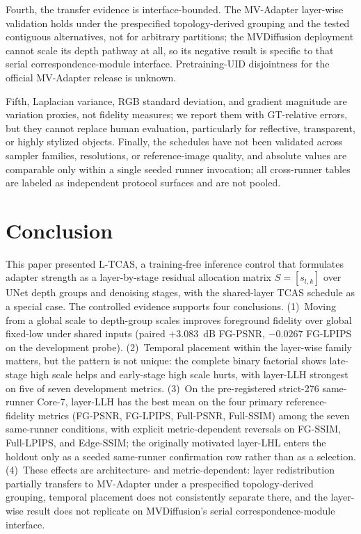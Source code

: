\documentclass[times,twocolumn,final]{elsarticle}
\begin{document}
Fourth, the transfer evidence is interface-bounded. The MV-Adapter layer-wise
validation holds under the prespecified topology-derived grouping and the
tested contiguous alternatives, not for arbitrary partitions; the
MVDiffusion deployment cannot scale its depth pathway at all, so its
negative result is specific to that serial correspondence-module interface.
Pretraining-UID disjointness for the official MV-Adapter release is unknown.

Fifth, Laplacian variance, RGB standard deviation, and gradient magnitude are
variation proxies, not fidelity measures; we report them with GT-relative
errors, but they cannot replace human evaluation, particularly for reflective,
transparent, or highly stylized objects. Finally, the schedules have not been
validated across sampler families, resolutions, or reference-image quality,
and absolute values are comparable only within a single seeded runner
invocation; all cross-runner tables are labeled as independent protocol
surfaces and are not pooled.

\section{Conclusion}
\label{sec:conclusion}

This paper presented L-TCAS, a training-free inference control that
formulates adapter strength as a layer-by-stage residual allocation matrix
$S=[s_{l,k}]$ over UNet depth groups and denoising stages, with the
shared-layer TCAS schedule as a special case. The controlled evidence
supports four conclusions. (1)~Moving from a global scale to depth-group
scales improves foreground fidelity over global fixed-low under shared
inputs (paired $+3.083$~dB FG-PSNR, $-0.0267$ FG-LPIPS on the development
probe). (2)~Temporal placement within the layer-wise family matters, but the
pattern is not unique: the complete binary factorial shows late-stage high
scale helps and early-stage high scale hurts, with layer-LLH strongest on
five of seven development metrics. (3)~On the pre-registered strict-276
same-runner Core-7, layer-LLH has the best mean on the four primary
reference-fidelity metrics (FG-PSNR, FG-LPIPS, Full-PSNR, Full-SSIM) among
the seven same-runner conditions, with explicit metric-dependent reversals
on FG-SSIM, Full-LPIPS, and Edge-SSIM; the originally motivated layer-LHL
enters the holdout only as a seeded same-runner confirmation row rather than
as a selection. (4)~These effects are architecture- and metric-dependent:
layer redistribution partially transfers to MV-Adapter under a prespecified
topology-derived grouping, temporal placement does not consistently separate
there, and the layer-wise result does not replicate on MVDiffusion's serial
correspondence-module interface.
\end{document}
